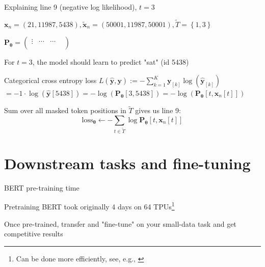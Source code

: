 \documentclass[12pt,aspectratio=169,handout]{beamer}
\begin{document}
\begin{frame}{Explaining line 9 (negative log likelihood), $t = 3$}
	
	\begin{small}
		$\bm{x}_n = (21, 11987, 5438), \bm{\tilde{x}}_n = (50001, 11987, 50001), \tilde{T} = \left\{ 1, 3 \right\}$
		
		$
		\bm{P_{\theta}} =
		\begin{pmatrix}
			\vdots &  \cdots &  \cdots &  \\
		\end{pmatrix}
		$
	\end{small}	
	
	For $t = 3$, the model should learn to predict "sat" (id 5438)
	
	\begin{block}{Categorical cross entropy loss}
		$L (\bm{\hat{y}, \bm{y}}) := - \sum_{k = 1}^{K} \bm{y}_{[k]} \log \left(  \bm{\hat{y}}_{[k]} \right)$ \\
		$= - 1 \cdot \log (\bm{\hat{y}}[5438])
		= - \log(\bm{P_{\theta}}[3, 5438])
		= - \log(\bm{P_{\theta}}[t, \bm{x}_n[t]])$	
	\end{block}
	
	
	Sum over all masked token positions in $\tilde{T}$ gives us line 9:\\
	$$\text{loss}_{\bm{\theta}} \gets - \sum_{t \in \tilde{T}} \log \bm{P_{\theta}} [t, \bm{x}_n[t]] $$
	
\end{frame}







\section{Downstream tasks and fine-tuning}





\begin{frame}{BERT pre-training time}
		
	Pretraining BERT took originally 4 days on 64 TPUs\footnote{Can be done more efficiently, see, e.g., \citet{izsak-etal-2021-train}}
	
	\bigskip
	
	Once pre-trained, transfer and "fine-tune" on your small-data task and get competitive results


	

	
\end{frame}
\end{document}
